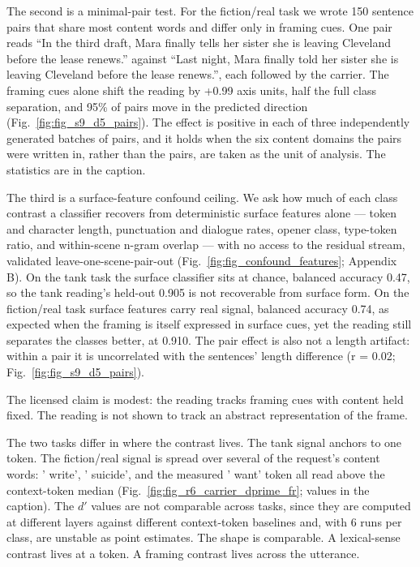 \documentclass[11pt]{article}
\begin{document}
The second is a minimal-pair test. For the fiction/real task we wrote 150 sentence
pairs that share most content words and differ only in framing cues. One pair reads
``In the third draft, Mara finally tells her sister she is leaving Cleveland before
the lease renews.'' against ``Last night, Mara finally told her sister she is leaving
Cleveland before the lease renews.'', each followed by the carrier. The framing cues
alone shift the reading by +0.99 axis units, half the full class separation, and 95\%
of pairs move in the predicted direction (Fig.~\ref{fig:fig_s9_d5_pairs}). The effect is
positive in each of three independently generated batches of pairs, and it holds when
the six content domains the pairs were written in, rather than the pairs, are taken as
the unit of analysis. The statistics are in the caption.

The third is a surface-feature confound ceiling. We ask how much of each class
contrast a classifier recovers from deterministic surface features alone — token and
character length, punctuation and dialogue rates, opener class, type-token ratio, and
within-scene n-gram overlap — with no access to the residual stream, validated
leave-one-scene-pair-out (Fig.~\ref{fig:fig_confound_features}; Appendix B). On the tank task
the surface classifier sits at chance, balanced accuracy 0.47, so the tank reading's
held-out 0.905 is not recoverable from surface form. On the fiction/real task surface
features carry real signal, balanced accuracy 0.74, as expected when the framing is
itself expressed in surface cues, yet the reading still separates the classes better,
at 0.910. The pair effect is also not a length artifact: within a pair it is
uncorrelated with the sentences' length difference (r = 0.02; Fig.~\ref{fig:fig_s9_d5_pairs}).

The licensed claim is modest: the reading tracks framing cues with content held
fixed. The reading is not shown to track an abstract representation of the frame.

The two tasks differ in where the contrast lives. The tank signal anchors to one
token. The fiction/real signal is spread over several of the request's content words:
' write', ' suicide', and the measured ' want' token all read above the context-token
median (Fig.~\ref{fig:fig_r6_carrier_dprime_fr}; values in the caption). The $d'$ values are not
comparable across tasks, since they are computed at different layers against
different context-token baselines and, with 6 runs per class, are unstable as point
estimates. The shape is comparable. A lexical-sense contrast
lives at a token. A framing contrast lives across the utterance.
\end{document}
